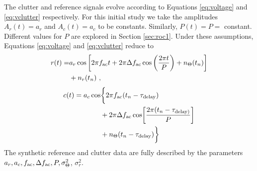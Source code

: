 \documentclass[pra,superscriptaddress,reprint,amsmath,amssymb,nofootinbib]{revtex4-2}
\begin{document}
The clutter and reference signals evolve according to Equations \eqref{eq:voltage} and \eqref{eq:vclutter} respectively. For this initial study we take the amplitudes $A_r(t) = a_r$ and $A_c(t) = a_c$ to be constants. Similarly, $P(t) = P=$ constant. Different values for $P$ are explored in Section \ref{sec:roc1}. Under these assumptions, Equations \eqref{eq:voltage} and \eqref{eq:vclutter} reduce to 
\begin{align}
 	r(t) =&a_r \cos \left[ 2 \pi f_{\rm ac} t +2 \pi \Delta f_{\rm ac} \cos\left(\frac{2 \pi t}{P}\right) + n_{\Theta} (t_n) \right] \nonumber \\ 
 	&+n_r(t_n) \ ,
\end{align}
\begin{align}
	c(t) = a_c \cos &\biggl \{ 2 \pi f_{\rm ac} (t_n - \tau_{\rm delay}) \nonumber \\ 
	&+ 2 \pi \Delta f_{\rm ac} \cos \biggl [ \frac{2 \pi (t_n - \tau_{\rm delay)}}{P} \biggr ] \nonumber \\ 
	&+ n_{\Theta} (t_n - \tau_{\rm delay}) \biggr \}
	\label{eq:clutterequation}
\end{align}
The synthetic reference and clutter data are fully described by the parameters $a_r,a_c,f_{\rm ac}, \Delta f_{\rm ac}, P,\sigma^2_{\Theta}$, $\sigma_r^2$. \newline 
\end{document}
